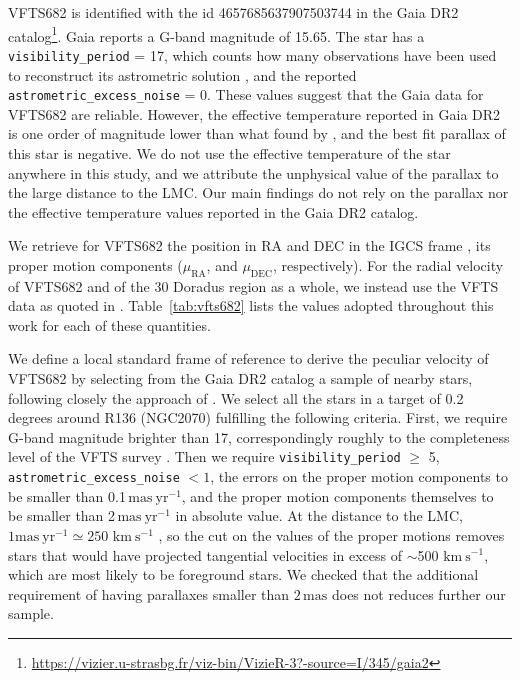\documentclass[apjl,twocolumn]{emulateapj}
\newcommand{\kms}{{\,\mathrm{km\ s^{-1}}}}
\DeclareRobustCommand{\Tabref}[1]{Table~\ref{#1}}
\begin{document}
VFTS682 is identified with the id 4657685637907503744 in the Gaia DR2
catalog\footnote{\url{https://vizier.u-strasbg.fr/viz-bin/VizieR-3?-source=I/345/gaia2}}. Gaia
reports a G-band magnitude of 15.65. The star has a
\texttt{visibility\_period} = 17, which counts how many observations have
been used to reconstruct its astrometric solution
\citep[][]{lindengren:18}, and the reported
\texttt{astrometric\_excess\_noise} = 0. These values suggest that the Gaia
data for VFTS682 are reliable. However, the effective temperature
reported in Gaia DR2 is one order of magnitude lower than what found by
\cite{bestenlehner:11}, and the best fit parallax of this star is
negative. We do not use the effective temperature of the star anywhere
in this study, and we attribute the unphysical value of the parallax
to the large distance to the LMC. Our main findings do not rely on the
parallax nor the effective temperature values reported in the Gaia DR2
catalog.

We retrieve for VFTS682 the position in RA and DEC
in the IGCS frame \cite[][]{brown:18}, its
proper motion components ($\mu_\mathrm{RA}$, and $\mu_\mathrm{DEC}$,
respectively). For the radial velocity of VFTS682 and of the 30 Doradus
region as a whole, we instead use the VFTS data
as quoted in \cite{bestenlehner:11}. \Tabref{tab:vfts682} lists the values adopted throughout
this work for each of these quantities.


We define a local standard frame of reference to derive the peculiar velocity
of VFTS682 by selecting from the Gaia DR2 catalog a sample of nearby
stars, following closely the approach of \cite{lennon:18}.
We select all the stars in a target of 0.2 degrees around R136
(NGC2070) fulfilling the following criteria. First, we require G-band
magnitude brighter than 17, correspondingly roughly to the
completeness level of the VFTS survey \citep[here we implicitly assume
G$\sim$V,][]{evans:11}. Then we require \texttt{visibility\_period} $\geq$ 5,
\texttt{astrometric\_excess\_noise} $< 1$, the errors on the proper
motion components to be smaller than 0.1\,$\mathrm{mas\ yr^{-1}}$,
and the proper motion components themselves to be smaller than
2\,$\mathrm{mas\ yr^{-1}}$ in absolute value. At the distance to the
LMC, $1\mathrm{mas\ yr^{-1}}\simeq250\,\kms$ \citep[e.g.,][]{lennon:18}, so the cut on the values
of the proper motions removes stars that would have projected
tangential velocities in excess of $\sim$500\,$\kms$, which are most
likely to be foreground stars. We checked that the additional
requirement of having parallaxes smaller than $2\,\mathrm{mas}$ does
not reduces further our sample. 
\end{document}
